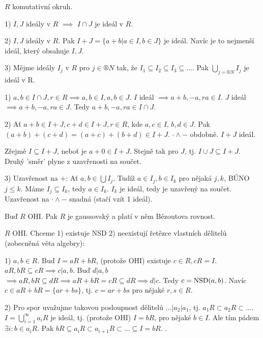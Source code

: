 \documentclass[12pt]{article}                   %
\begin{document}
        \begin{tvrzeni}
            $R$ komutativní okruh.

            1) $I, J$ ideály v $R$ $\implies$ $I \cap J$ je ideál v $R$.

            2) $I, J$ ideály v $R$. Pak $I + J = \{a + b | a \in I, b \in J\}$ je ideál. Navíc je to nejmenší ideál, který obsahuje $I, J$.

            3) Mějme ideály $I_j$ v $R$ pro $j \in ®N$ tak, že $I_1 \subseteq I_2 \subseteq I_3 \subseteq …$. Pak $\bigcup_{j=®N}I_j$ je ideál v R.

            \begin{dukazin}
                1) $a, b \in I \cap J, r \in R \implies a, b \in I, a, b \in J$. $I$ ideál $\implies a + b, -a, ra \in I$. $J$ ideál $\implies a + b, -a, ra \in J$. Tedy $a + b, -a, ra \in I \cap J$.

                2) Ať $a + b \in I + J, c + d \in I + J, r \in R$, kde $a, c \in I$, $b, d \in J$. Pak $(a+b) + (c+d) = (a + c) + (b + d) \in I + J$. $· \land -$ obdobně. $I + J$ ideál.

                Zřejmě $I \subseteq I + J$, neboť je $a + 0 \in I + J$. Stejně tak pro $J$, tj. $I \cup J \subseteq I + J$. Druhý 'směr' plyne z uzavřenosti na součet.

                3) Uzavřenost na $+$: Ať $a, b \in \bigcup I_j$. Tudíž $a \in I_j, b \in I_k$ pro nějaká $j, k$, BÚNO $j ≤ k$. Máme $I_j \subseteq I_k$, tedy $a \in I_k$. $I_k$ je ideál, tedy je uzavřený na součet. Uzavřenost na $· \land -$ snadná (stačí vzít 1 ideál).
            \end{dukazin}
        \end{tvrzeni}


        \begin{veta}
            Buď $R$ OHI. Pak $R$ je gaussovský a platí v něm Bézoutova rovnost.

            \begin{dukazin}
                $R$ OHI. Chceme 1) existuje NSD 2) neexistují řetězce vlastních dělitelů (zobecněná věta algebry):

                1) $a, b \in R$. Buď $I = aR + bR$, (protože OHI) existuje $c \in R, cR = I$. $aR, bR \subseteq cR \implies c|a, b$. Buď $d |a, b$ $\implies aR, bR \subseteq dR \implies aR+bR = cR \subseteq dR \implies d|c$. Tedy $c = \operatorname{NSD}(a, b)$. Navíc $c \in aR + bR = \{ar+bs\}$, tj. $c=ar+bs$ pro nějaké $r, s \in R$.

                2) Pro spor uvažujme takovou posloupnost dělitelů $…|a_2|a_1$, tj. $a_1R \subset a_2R \subset …$. $I = \bigcup_{i=1}^∞ a_iR$ je ideál, tj. (protože OHI) $I = bR$, pro nějaké $b \in I$. Ale tím pádem $\exists i: b \in a_iR$. Pak $bR \subseteq a_iR \subset a_{i+1}R \subset … \subseteq I = bR$. \lightning.
            \end{dukazin}
        \end{veta}
\end{document}
